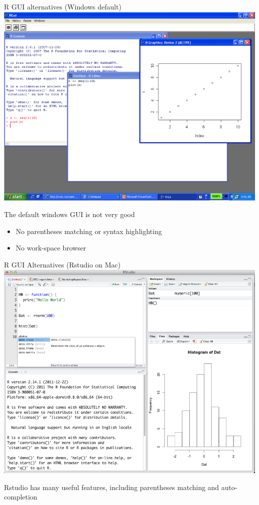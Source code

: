 \documentclass[table,smaller]{beamer}
\begin{document}
\begin{frame}[label=sec-2-2]{R GUI alternatives (Windows default)}
\includegraphics[width=.75\textwidth]{images/Rgui.png}

The default windows GUI is not very good
\begin{itemize}
\item No parentheses matching or syntax highlighting
\item No work-space browser
\end{itemize}
\end{frame}


\begin{frame}[label=sec-2-3]{R GUI Alternatives (Rstudio on Mac)}
\includegraphics[width=.75\textwidth]{images/Rstudio.png}

Rstudio has many useful features, including parentheses matching and auto-completion
\end{frame}
\end{document}
